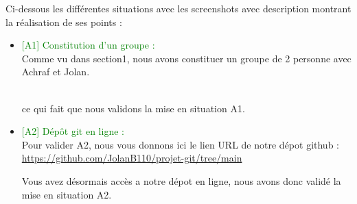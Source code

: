 Ci-dessous les différentes situations avec les screenshots avec description montrant la réalisation de ses points :

\begin{itemize}
    \item \textcolor{green}{[A1] Constitution d’un groupe :}
    \\Comme vu dans section1, nous avons constituer un groupe de 2 personne avec Achraf et Jolan.
    \begin{figure}[h]
    \centering
    \end{figure}
    \\ce qui fait que nous validons la mise en situation A1.

    \item \textcolor{green}{[A2] Dépôt git en ligne : }
    \\Pour valider A2, nous vous donnons ici le lien URL de notre dépot github : 
    \url{https://github.com/JolanB110/projet-git/tree/main}

    Vous avez désormais accès a notre dépot en ligne, nous avons donc validé la mise en situation A2.
    

\end{itemize}
